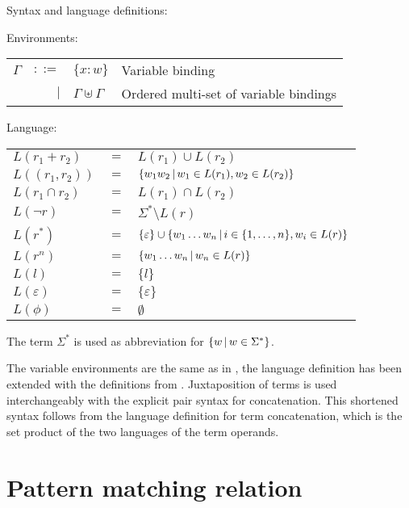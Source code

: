 \begin{defn}
   \label{defn-lang}
   Syntax and language definitions:

   Environments:

   \begin{tabular}{lrll}
      $\Gamma$	& $::=$	& $\{x:w\}$			& Variable binding	\\
		& $|$	& $\Gamma \uplus \Gamma$	& Ordered multi-set of
							  variable bindings	\\
   \end{tabular}

   \needspace{5cm}

   Language:

   \begin{tabular}{lll}
      $L(r_1 + r_2)$	& $=$	& $L(r_1) \cup L(r_2)$					\\
      $L((r_1, r_2))$	& $=$	& $\{ w_1w_2 \operatorname{|} w_1 \in L(r_1), w_2 \in L(r_2) \}$	\\
      $L(r_1 \cap r_2)$	& $=$	& $L(r_1) \cap L(r_2)$					\\
      $L(\neg r)$	& $=$	& $\Sigma^* \setminus L(r)$				\\
      $L(r^*)$		& $=$	&
         $\{\varepsilon\} \cup \{ w_1 \dots w_n \operatorname{|} i
         \in \{ 1, \dots, n \}, w_i \in L(r) \}$	\\
      $L(r^n)$		& $=$	&
         $\{ w_1 \dots w_n \operatorname{|} w_n \in L(r) \}$	\\
      $L(l)$		& $=$	& $\{l\}$						\\
      $L(\varepsilon)$	& $=$	& $\{\varepsilon\}$					\\
      $L(\phi)$		& $=$	& $\emptyset$						\\
   \end{tabular}
\end{defn}


The term $\Sigma^*$ is used as abbreviation for $\{ w \operatorname{|} w \in \Sigma^* \}$.

The variable environments are the same as in \cite{pdpat}, the language
definition has been extended with the definitions from \cite{pdere}.
Juxtaposition of terms is used interchangeably with the explicit pair syntax
for concatenation. This shortened syntax follows from the language definition
for term concatenation, which is the set product of the two languages of the
term operands.


\section{Pattern matching relation}
\label{patmatchrel}

